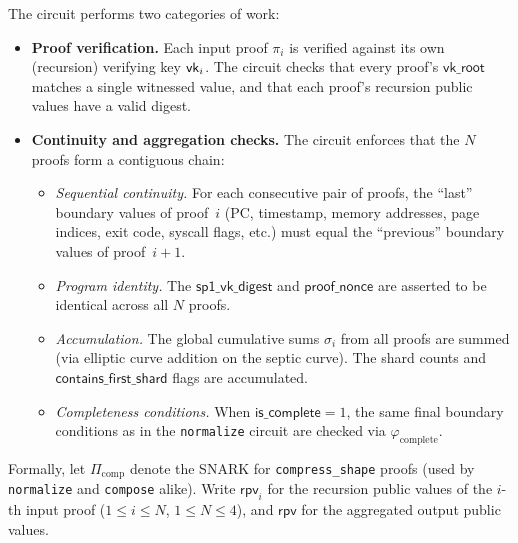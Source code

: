 \documentclass[11pt]{article}
\begin{document}
The circuit performs two categories of work:
\begin{itemize}
\item \textbf{Proof verification.}
Each input proof $\pi_i$ is verified against its own (recursion) verifying key $\mathsf{vk}_i$.
The circuit checks that every proof's $\mathsf{vk\_root}$ matches
a single witnessed value, and that each proof's recursion public values
have a valid digest.

\item \textbf{Continuity and aggregation checks.}
The circuit enforces that the $N$ proofs form a contiguous chain:
\begin{itemize}
\item \emph{Sequential continuity.}
For each consecutive pair of proofs,
the ``last'' boundary values of proof~$i$
(PC, timestamp, memory addresses, page indices,
exit code, syscall flags, etc.)
must equal the ``previous'' boundary values of proof~$i{+}1$.
\item \emph{Program identity.}
The $\mathsf{sp1\_vk\_digest}$ and $\mathsf{proof\_nonce}$ are
asserted to be identical across all $N$ proofs.
\item \emph{Accumulation.}
The global cumulative sums $\sigma_i$ from all proofs are summed
(via elliptic curve addition on the septic curve).
The shard counts and $\mathsf{contains\_first\_shard}$ flags
are accumulated.
\item \emph{Completeness conditions.}
When $\mathsf{is\_complete}=1$,
the same final boundary conditions as in the \texttt{normalize} circuit
are checked via $\varphi_{\mathrm{complete}}$.
\end{itemize}
\end{itemize}

Formally, let $\Pi_{\mathrm{comp}}$ denote the SNARK for \texttt{compress\_shape} proofs
(used by \texttt{normalize} and \texttt{compose} alike).
Write $\mathsf{rpv}_i$ for the recursion public values of the $i$-th input proof
($1\leq i\leq N$, $1\leq N\leq 4$),
and $\mathsf{rpv}$ for the aggregated output public values.
\end{document}
